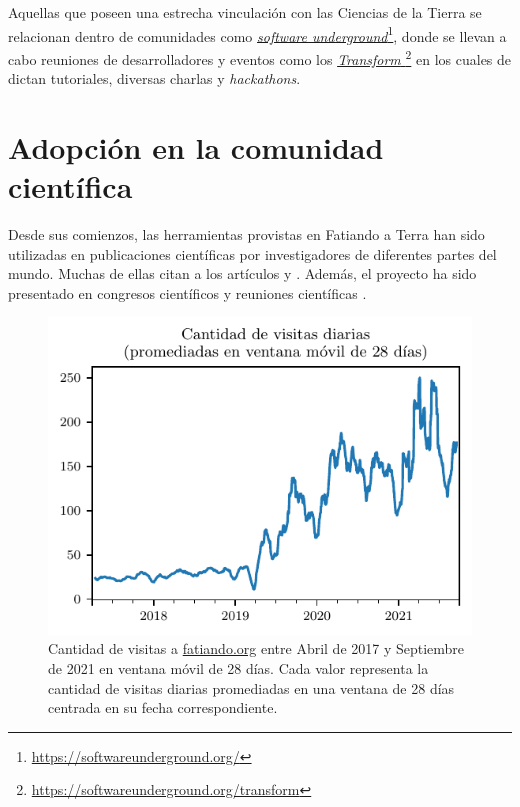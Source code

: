 Aquellas que poseen una estrecha vinculación con las Ciencias de la Tierra
se relacionan dentro de comunidades como
\href{https://softwareunderground.org/}{\emph{software
underground}}\footnote{\url{https://softwareunderground.org/}}, donde se
llevan a cabo reuniones de desarrolladores y eventos como los
\href{%
    https://softwareunderground.org/transform
}{%
    \emph{Transform}
}\footnote{\url{https://softwareunderground.org/transform}} en los cuales de
dictan tutoriales, diversas charlas y \emph{hackathons}.


\section{Adopción en la comunidad científica}

Desde sus comienzos, las herramientas provistas en Fatiando a Terra han sido
utilizadas en publicaciones científicas por investigadores de diferentes partes
del mundo.
Muchas de ellas citan a los artículos \citet{uieda2013} y \citet{verde2018}.
Además, el proyecto ha sido presentado en congresos científicos y reuniones
científicas \citep{uieda2013,uieda2020b,soler2021c}.

\begin{figure}[bh!]
    \centering
    \includegraphics[width=0.7\linewidth]{figs/fatiando/users_history.pdf}
    \caption{
        Cantidad de visitas a \href{https://fatiando.org}{fatiando.org} entre
        Abril de 2017 y Septiembre de 2021 en ventana móvil de 28 días.
        Cada valor representa la cantidad de visitas diarias promediadas en una
        ventana de 28 días centrada en su fecha correspondiente.
    }
    \label{fig:fatiando-users-history}
\end{figure}

